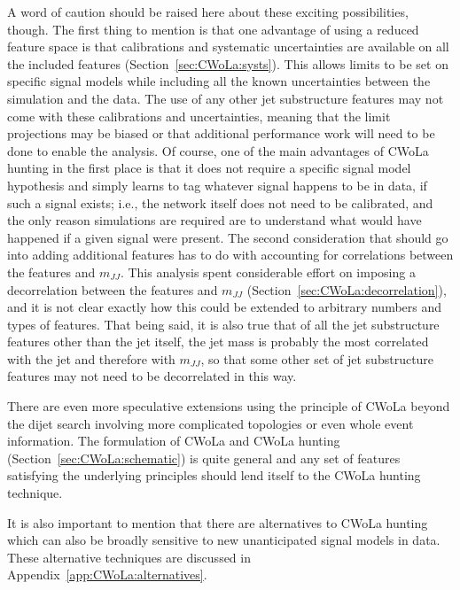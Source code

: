 A word of caution should be raised here about these exciting possibilities, though.
The first thing to mention is that one advantage of using a reduced feature space is that calibrations and systematic uncertainties are available on all the included features (Section~\ref{sec:CWoLa:systs}).
This allows limits to be set on specific signal models while including all the known uncertainties between the simulation and the data.
The use of any other jet substructure features may not come with these calibrations and uncertainties, meaning that the limit projections may be biased or that additional performance work will need to be done to enable the analysis.
Of course, one of the main advantages of CWoLa hunting in the first place is that it does not require a specific signal model hypothesis and simply learns to tag whatever signal happens to be in data, if such a signal exists; i.e., the network itself does not need to be calibrated, and the only reason simulations are required are to understand what would have happened if a given signal were present.
The second consideration that should go into adding additional features has to do with accounting for correlations between the features and $m_{JJ}$.
This analysis spent considerable effort on imposing a decorrelation between the features and $m_{JJ}$ (Section~\ref{sec:CWoLa:decorrelation}), and it is not clear exactly how this could be extended to arbitrary numbers and types of features.
That being said, it is also true that of all the jet substructure features other than the jet \pt{} itself, the jet mass is probably the most correlated with the jet \pt{} and therefore with $m_{JJ}$, so that some other set of jet substructure features may not need to be decorrelated in this way.

There are even more speculative extensions using the principle of CWoLa beyond the dijet search involving more complicated topologies or even whole event information.
The formulation of CWoLa and CWoLa hunting (Section~\ref{sec:CWoLa:schematic}) is quite general and any set of features satisfying the underlying principles should lend itself to the CWoLa hunting technique.

It is also important to mention that there are alternatives to CWoLa hunting which can also be broadly sensitive to new unanticipated signal models in data.
These alternative techniques are discussed in Appendix~\ref{app:CWoLa:alternatives}.

